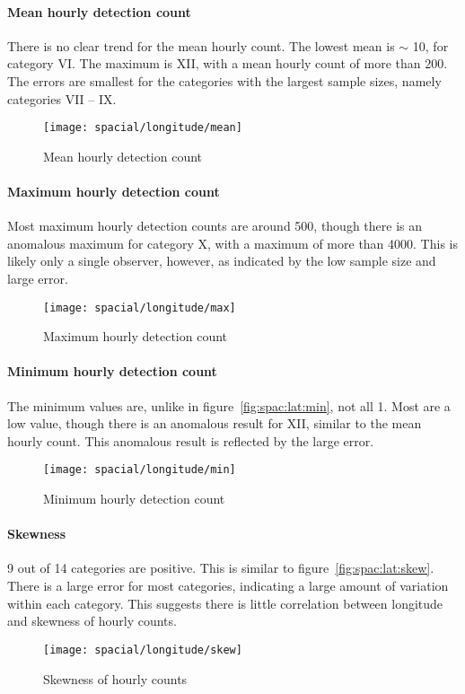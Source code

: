 \paragraph{Mean hourly detection count\\}
There is no clear trend for the mean hourly count. The lowest mean is $\sim$ 10, for category VI. The maximum is XII, with a mean hourly count of more than 200. The errors are smallest for the categories with the largest sample sizes, namely categories VII -- IX.
\begin{figure}[h!]
	\centering
	\texttt{[image: spacial/longitude/mean]}
	\caption{Mean hourly detection count
		\label{fig:spac:lon:mean}}
\end{figure}
\paragraph{Maximum hourly detection count\\}
Most maximum hourly detection counts are around 500, though there is an anomalous maximum for category X, with a maximum of more than 4000. This is likely only a single observer, however, as indicated by the low sample size and large error.
\begin{figure}[h!]
	\centering
	\texttt{[image: spacial/longitude/max]}
	\caption{Maximum hourly detection count
		\label{fig:spac:lon:max}}
\end{figure}
\paragraph{Minimum hourly detection count\\}
The minimum values are, unlike in figure~\ref{fig:spac:lat:min}, not all 1. Most are a low value, though there is an anomalous result for XII, similar to the mean hourly count. This anomalous result is reflected by the large error.
\begin{figure}[h!]
	\centering
	\texttt{[image: spacial/longitude/min]}
	\caption{Minimum hourly detection count 
		\label{fig:spac:long:min}}
\end{figure}
\paragraph{Skewness\\}
9 out of 14 categories are positive. This is similar to figure~\ref{fig:spac:lat:skew}. There is a large error for most categories, indicating a large amount of variation within each category. This suggests there is little correlation between longitude and skewness of hourly counts.
\begin{figure}[h!]
	\centering
	\texttt{[image: spacial/longitude/skew]}
	\caption{Skewness of hourly counts
		\label{fig:spac:lon:skew}}
\end{figure}
